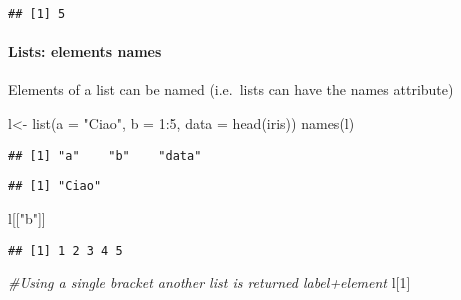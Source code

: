 \documentclass[
]{article}
\newenvironment{Shaded}{\begin{snugshade}}{\end{snugshade}}
\newcommand{\AttributeTok}[1]{\textcolor[rgb]{0.77,0.63,0.00}{#1}}
\newcommand{\CommentTok}[1]{\textcolor[rgb]{0.56,0.35,0.01}{\textit{#1}}}
\newcommand{\DecValTok}[1]{\textcolor[rgb]{0.00,0.00,0.81}{#1}}
\newcommand{\FunctionTok}[1]{\textcolor[rgb]{0.00,0.00,0.00}{#1}}
\newcommand{\NormalTok}[1]{#1}
\newcommand{\OtherTok}[1]{\textcolor[rgb]{0.56,0.35,0.01}{#1}}
\newcommand{\SpecialCharTok}[1]{\textcolor[rgb]{0.00,0.00,0.00}{#1}}
\newcommand{\StringTok}[1]{\textcolor[rgb]{0.31,0.60,0.02}{#1}}
\begin{document}
\begin{verbatim}
## [1] 5
\end{verbatim}

\hypertarget{lists-elements-names}{%
\paragraph{Lists: elements names}\label{lists-elements-names}}

Elements of a list can be named (i.e.~lists can have the names
attribute)

\begin{Shaded}
\begin{Highlighting}[]
\NormalTok{l}\OtherTok{\textless{}{-}} \FunctionTok{list}\NormalTok{(}\AttributeTok{a =} \StringTok{"Ciao"}\NormalTok{, }\AttributeTok{b =} \DecValTok{1}\SpecialCharTok{:}\DecValTok{5}\NormalTok{, }\AttributeTok{data =} \FunctionTok{head}\NormalTok{(iris))}
\FunctionTok{names}\NormalTok{(l)}
\end{Highlighting}
\end{Shaded}

\begin{verbatim}
## [1] "a"    "b"    "data"
\end{verbatim}

\begin{Shaded}
\end{Shaded}

\begin{verbatim}
## [1] "Ciao"
\end{verbatim}

\begin{Shaded}
\begin{Highlighting}[]
\NormalTok{l[[}\StringTok{"b"}\NormalTok{]]}
\end{Highlighting}
\end{Shaded}

\begin{verbatim}
## [1] 1 2 3 4 5
\end{verbatim}

\begin{Shaded}
\begin{Highlighting}[]
\CommentTok{\#Using a single bracket another list is returned label+element}
\NormalTok{l[}\DecValTok{1}\NormalTok{]}
\end{Highlighting}
\end{Shaded}
\end{document}
